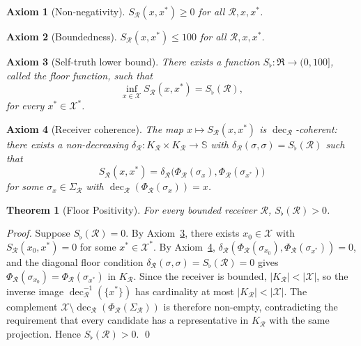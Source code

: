 \documentclass[twocolumn,a4paper]{article}
\newtheorem{theorem}{Theorem}[section]
\newtheorem{axiom}{Axiom}
\DeclareMathOperator{\dec}{dec}
\newcommand{\Sscale}{\mathbb{S}}
\newcommand{\Cands}{\mathcal{X}}
\newcommand{\Truth}{\mathcal{X}^{*}}
\newcommand{\receiver}{\mathcal{R}}
\newcommand{\Receiver}{\mathfrak{R}}
\newcommand{\Sscalar}{S}
\newcommand{\Sfloor}{S_{\flat}}
\begin{document}
\begin{axiom}[Non-negativity]
\label{ax:S1}
$\Sscalar_{\receiver}(x,x^{*})\geq 0$ for all $\receiver,x,x^{*}$.
\end{axiom}

\begin{axiom}[Boundedness]
\label{ax:S2}
$\Sscalar_{\receiver}(x,x^{*})\leq 100$ for all $\receiver,x,x^{*}$.
\end{axiom}

\begin{axiom}[Self-truth lower bound]
\label{ax:S3}
There exists a function $\Sfloor\colon\Receiver\to(0,100]$, called the \emph{floor function}, such that
\[
\inf_{x\in\Cands}\Sscalar_{\receiver}(x,x^{*})=\Sfloor(\receiver),
\]
for every $x^{*}\in\Truth$.
\end{axiom}

\begin{axiom}[Receiver coherence]
\label{ax:S4}
The map $x\mapsto\Sscalar_{\receiver}(x,x^{*})$ is $\dec_{\receiver}$-coherent: there exists a non-decreasing $\delta_{\receiver}\colon K_{\receiver}\times K_{\receiver}\to\Sscale$ with $\delta_{\receiver}(\sigma,\sigma)=\Sfloor(\receiver)$ such that
\[
\Sscalar_{\receiver}(x,x^{*})=\delta_{\receiver}\bigl(\Phi_{\receiver}(\sigma_{x}),\Phi_{\receiver}(\sigma_{x^{*}})\bigr)
\]
for some $\sigma_{x}\in\Sigma_{\receiver}$ with $\dec_{\receiver}(\Phi_{\receiver}(\sigma_{x}))=x$.
\end{axiom}

\begin{theorem}[Floor Positivity]
\label{thm:floor-positivity}
For every bounded receiver $\receiver$, $\Sfloor(\receiver)>0$.
\end{theorem}

\begin{proof}
Suppose $\Sfloor(\receiver)=0$. By Axiom~\ref{ax:S3}, there exists $x_{0}\in\Cands$ with $\Sscalar_{\receiver}(x_{0},x^{*})=0$ for some $x^{*}\in\Truth$. By Axiom~\ref{ax:S4}, $\delta_{\receiver}(\Phi_{\receiver}(\sigma_{x_{0}}),\Phi_{\receiver}(\sigma_{x^{*}}))=0$, and the diagonal floor condition $\delta_{\receiver}(\sigma,\sigma)=\Sfloor(\receiver)=0$ gives $\Phi_{\receiver}(\sigma_{x_{0}})=\Phi_{\receiver}(\sigma_{x^{*}})$ in $K_{\receiver}$. Since the receiver is bounded, $|K_{\receiver}|<|\Cands|$, so the inverse image $\dec_{\receiver}^{-1}(\{x^{*}\})$ has cardinality at most $|K_{\receiver}|<|\Cands|$. The complement $\Cands\setminus\dec_{\receiver}(\Phi_{\receiver}(\Sigma_{\receiver}))$ is therefore non-empty, contradicting the requirement that every candidate has a representative in $K_{\receiver}$ with the same projection. Hence $\Sfloor(\receiver)>0$. \qed
\end{proof}
\end{document}
